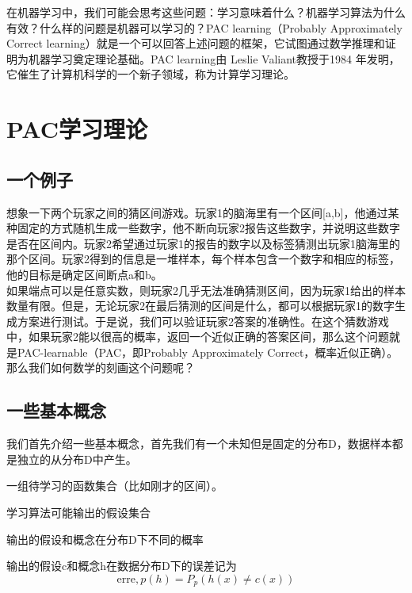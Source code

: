 \documentclass{article}
\begin{document}
在机器学习中，我们可能会思考这些问题：学习意味着什么？机器学习算法为什么有效？什么样的问题是机器可以学习的？PAC learning（Probably Approximately Correct learning）就是一个可以回答上述问题的框架，它试图通过数学推理和证明为机器学习奠定理论基础。PAC learning由 Leslie Valiant教授于1984 年发明，它催生了计算机科学的一个新子领域，称为计算学习理论。

\section{PAC学习理论}
\subsection{一个例子}
想象一下两个玩家之间的猜区间游戏。玩家1的脑海里有一个区间[a,b]，他通过某种固定的方式随机生成一些数字，他不断向玩家2报告这些数字，并说明这些数字是否在区间内。玩家2希望通过玩家1的报告的数字以及标签猜测出玩家1脑海里的那个区间。玩家2得到的信息是一堆样本，每个样本包含一个数字和相应的标签，他的目标是确定区间断点a和b。\\
如果端点可以是任意实数，则玩家2几乎无法准确猜测区间，因为玩家1给出的样本数量有限。但是，无论玩家2在最后猜测的区间是什么，都可以根据玩家1的数字生成方案进行测试。于是说，我们可以验证玩家2答案的准确性。在这个猜数游戏中，如果玩家2能以很高的概率，返回一个近似正确的答案区间，那么这个问题就是PAC-learnable（PAC，即Probably Approximately Correct，概率近似正确）。\\
那么我们如何数学的刻画这个问题呢？
\subsection{一些基本概念}
我们首先介绍一些基本概念，首先我们有一个未知但是固定的分布D，数据样本都是独立的从分布D中产生。
\begin{definition}
一组待学习的函数集合（比如刚才的区间）。
\end{definition}
\begin{definition}
学习算法可能输出的假设集合
\end{definition}
\begin{definition}[误差]
输出的假设和概念在分布D下不同的概率
\end{definition}
输出的假设c和概念h在数据分布D下的误差记为
\[ \text{erre}, p(h) = P_p(h(x) \neq c(x)) \]
\end{document}
